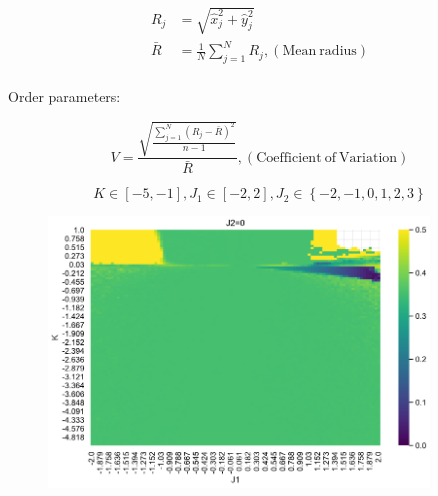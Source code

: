 \documentclass[10pt,aspectratio=43,mathserif,table]{beamer}
\begin{document}
\begin{frame}
    $$
    \begin{aligned}
        R_j&=\sqrt{\hat{x}_{j}^{2}+\hat{y}_{j}^{2}}\\
        \bar{R}&=\frac{1}{N}\sum_{j=1}^N{R_j},\left( \mathrm{Mean}\ \mathrm{radius} \right)\\
    \end{aligned}
    $$

    Order parameters:
    
    $$
    V=\frac{\sqrt{\frac{\sum\nolimits_{j=1}^N{\left( R_j-\bar{R} \right) ^2}}{n-1}}}{\bar{R}}, \left( \mathrm{Coefficient}\ \mathrm{of}\ \mathrm{Variation} \right)
    $$


\end{frame}

\begin{frame}
    $$
    K\in \left[ -5, -1 \right] , J_1\in \left[ -2, 2 \right] , J_2\in \left\{ -2, -1, 0, 1, 2, 3 \right\} 
    $$
    \begin{figure}
        \centering
        \includegraphics[width=0.9\textwidth]{map.png}
    \end{figure}
\end{frame}
\end{document}
